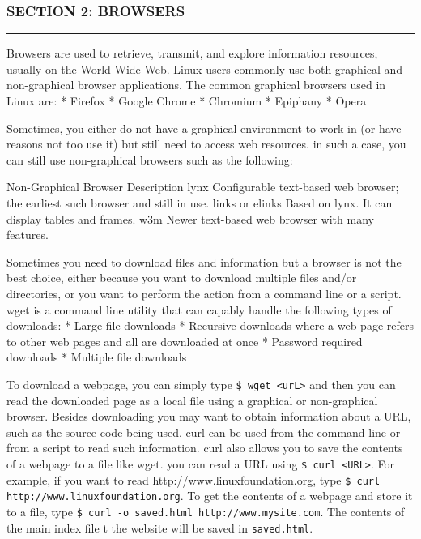 \subsubsection{SECTION 2: BROWSERS}\label{section-2-browsers}

\begin{center}\rule{3in}{0.4pt}\end{center}

Browsers are used to retrieve, transmit, and explore information
resources, usually on the World Wide Web. Linux users commonly use both
graphical and non-graphical browser applications. The common graphical
browsers used in Linux are: * Firefox * Google Chrome * Chromium *
Epiphany * Opera

Sometimes, you either do not have a graphical environment to work in (or
have reasons not too use it) but still need to access web resources. in
such a case, you can still use non-graphical browsers such as the
following:

Non-Graphical Browser \textbar{} Description lynx \textbar{}
Configurable text-based web browser; the earliest such browser and still
in use. links or elinks \textbar{} Based on lynx. It can display tables
and frames. w3m \textbar{} Newer text-based web browser with many
features.

Sometimes you need to download files and information but a browser is
not the best choice, either because you want to download multiple files
and/or directories, or you want to perform the action from a command
line or a script. wget is a command line utility that can capably handle
the following types of downloads: * Large file downloads * Recursive
downloads where a web page refers to other web pages and all are
downloaded at once * Password required downloads * Multiple file
downloads

To download a webpage, you can simply type
\texttt{\$ wget \textless{}urL\textgreater{}} and then you can read the
downloaded page as a local file using a graphical or non-graphical
browser. Besides downloading you may want to obtain information about a
URL, such as the source code being used. curl can be used from the
command line or from a script to read such information. curl also allows
you to save the contents of a webpage to a file like wget. you can read
a URL using \texttt{\$ curl \textless{}URL\textgreater{}}. For example,
if you want to read http://www.linuxfoundation.org, type
\texttt{\$ curl http://www.linuxfoundation.org}. To get the contents of
a webpage and store it to a file, type
\texttt{\$ curl -o saved.html http://www.mysite.com}. The contents of
the main index file t the website will be saved in \texttt{saved.html}.

